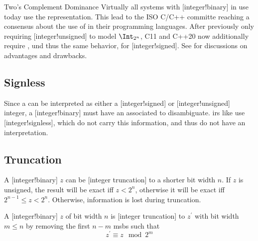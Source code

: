 \begin{highlight}{Two's Complement Dominance}
Virtually all systems with [integer!binary] in use today use the  representation.
This lead to the ISO C/C++ committe reaching a consensus about the use of  in their programming languages.
After previously only requiring [integer!unsigned] to model \(\Int_{2^n}\), C11 and C++20 now additionally require , und thus the same behavior, for [integer!signed].
See \cite{ISO_C_N2218,ISO_C_P0907R4} for discussions on advantages and drawbacks.
\end{highlight}

\subsection{Signless}

Since a  can be interpreted as either a [integer!signed] or [integer!unsigned] integer, a [integer!binary] must have an associated  to disambiguate.
\Glspl{ir} like \LLVMIR use [integer!signless], which do not carry this information, and thus do not have an interpretation.

\subsection{Truncation}

A [integer!binary] \(z\) can be [integer truncation] to a shorter bit width \(n\).
If \(z\) is unsigned, the result will be exact iff \(z < 2^n\), otherwise it will be exact iff \(2^{n-1} \le z < 2^{n}\).
Otherwise, information is lost during truncation.

\begin{definition}
    A [integer!binary] \(z\) of bit width \(n\) is [integer truncation] to \(z^\prime\) with bit width \(m \le n\) by removing the first \(n - m\) \glspl{msb} such that
    \begin{equation*}
        \label{eq:trunc}
        \tag{trunc}
        z^\prime \equiv z \mod 2^m
    \end{equation*}
\end{definition}

